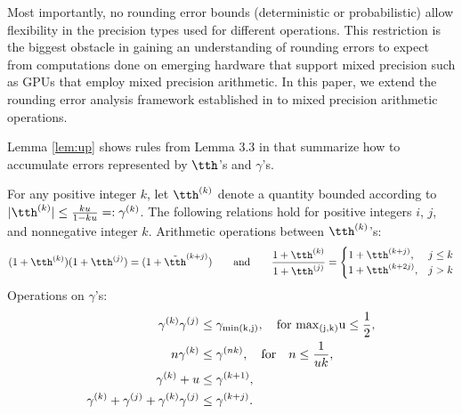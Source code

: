 Most importantly, no rounding error bounds (deterministic or probabilistic) allow flexibility in the precision types used for different operations. 
This restriction is the biggest obstacle in gaining an understanding of rounding errors to expect from computations done on emerging hardware that support mixed precision such as GPUs that employ mixed precision arithmetic.
In this paper, we extend the rounding error analysis framework established in \cite{Higham2002} to mixed precision arithmetic operations. 




Lemma \ref{lem:up} shows rules from Lemma 3.3 in \cite{Higham2002} that summarize how to accumulate errors represented by $\tth$'s and $\gamma$'s.
\begin{lemma}
	\label{lem:up}
	For any positive integer $k$, let $\tth^{(k)}$ denote a quantity bounded according to $|\tth^{(k)}|\leq \frac{k u }{1-ku} =:\gamma^{(k)}$. The following relations hold for positive integers $i$, $j$, and nonnegative integer $k$.
	Arithmetic operations between $\tth^{(k)}$'s: 
\begin{equation}
	    (1+\tth^{(k)})(1+\tth^{(j)})%
=(1+\tilde{\tth}^{(k+j)}) %
\qquad \mbox{and} \qquad
	    \frac{1+\tth^{(k)}}{1+\tth^{(j)}} %
=
\begin{cases}
	1+\tth^{(k+j)},& j \leq k\\
	1+\tth^{(k+2j)},& j > k\\
	\end{cases} 
\end{equation}
	Operations on $\gamma$'s: 
	\begin{align*}
	\gamma^{(k)}\gamma^{(j)} &\leq \gamma_{\rm{min}(k,j)}, \quad\text{for } \rm{max}_{(j,k)} u \leq \frac{1}{2}, \\
	n\gamma^{(k)} &\leq \gamma^{(nk)}, \quad \mbox{for} \quad n \leq \frac{1}{uk},\\
	\gamma^{(k)} + u &\leq \gamma^{(k+1)}, \\ 
	\gamma^{(k)}+\gamma^{(j)}+\gamma^{(k)}\gamma^{(j)} & \leq \gamma^{(k+j)}.
	    \end{align*}
\end{lemma}

